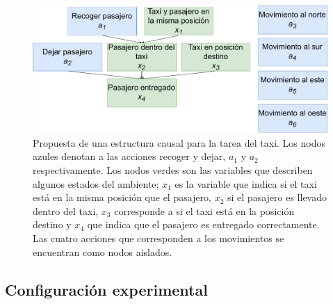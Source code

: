 \begin{figure}
    \centering
    \includegraphics[scale=0.3]{Chapter5/Figs/taxi_cg.pdf}
    \caption{Propuesta de una estructura causal para la tarea del taxi. Los nodos azules
    denotan a las acciones recoger y dejar, $a_1$ y $a_2$ respectivamente. Los nodos verdes son las variables que describen algunos estados del ambiente; $x_1$
es la variable que indica si el taxi está en la misma posición que el
pasajero, $x_2$  si el pasajero es llevado dentro del taxi, $x_3$ corresponde a si el taxi está en la posición destino y $x_4$ que indica que el pasajero es entregado correctamente. Las cuatro acciones que corresponden a los movimientos
se encuentran como nodos aislados.}
    \label{fig:cm-taxi}
\end{figure}


\subsection{Configuración experimental}

